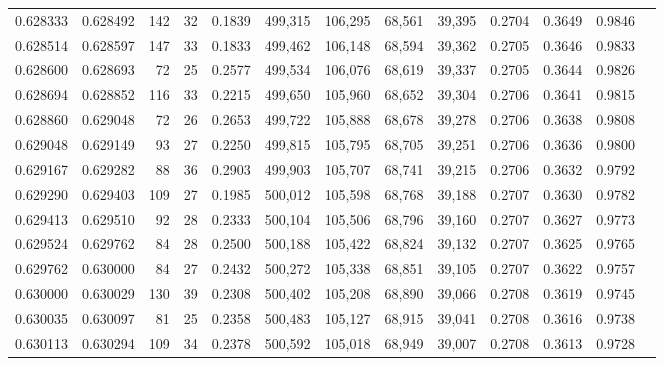 \begin{tabular}{rrrrrrrrrrrrr}
0.628333 & 0.628492 &    142 &    32 &                                     0.1839 & 499,315 & 106,295 &  68,561 &  39,395 & 0.2704 & 0.3649 & 0.9846 \\
0.628514 & 0.628597 &    147 &    33 &                                     0.1833 & 499,462 & 106,148 &  68,594 &  39,362 & 0.2705 & 0.3646 & 0.9833 \\
0.628600 & 0.628693 &     72 &    25 &                                     0.2577 & 499,534 & 106,076 &  68,619 &  39,337 & 0.2705 & 0.3644 & 0.9826 \\
0.628694 & 0.628852 &    116 &    33 &                                     0.2215 & 499,650 & 105,960 &  68,652 &  39,304 & 0.2706 & 0.3641 & 0.9815 \\
0.628860 & 0.629048 &     72 &    26 &                                     0.2653 & 499,722 & 105,888 &  68,678 &  39,278 & 0.2706 & 0.3638 & 0.9808 \\
0.629048 & 0.629149 &     93 &    27 &                                     0.2250 & 499,815 & 105,795 &  68,705 &  39,251 & 0.2706 & 0.3636 & 0.9800 \\
0.629167 & 0.629282 &     88 &    36 &                                     0.2903 & 499,903 & 105,707 &  68,741 &  39,215 & 0.2706 & 0.3632 & 0.9792 \\
0.629290 & 0.629403 &    109 &    27 &                                     0.1985 & 500,012 & 105,598 &  68,768 &  39,188 & 0.2707 & 0.3630 & 0.9782 \\
0.629413 & 0.629510 &     92 &    28 &                                     0.2333 & 500,104 & 105,506 &  68,796 &  39,160 & 0.2707 & 0.3627 & 0.9773 \\
0.629524 & 0.629762 &     84 &    28 &                                     0.2500 & 500,188 & 105,422 &  68,824 &  39,132 & 0.2707 & 0.3625 & 0.9765 \\
0.629762 & 0.630000 &     84 &    27 &                                     0.2432 & 500,272 & 105,338 &  68,851 &  39,105 & 0.2707 & 0.3622 & 0.9757 \\
0.630000 & 0.630029 &    130 &    39 &                                     0.2308 & 500,402 & 105,208 &  68,890 &  39,066 & 0.2708 & 0.3619 & 0.9745 \\
0.630035 & 0.630097 &     81 &    25 &                                     0.2358 & 500,483 & 105,127 &  68,915 &  39,041 & 0.2708 & 0.3616 & 0.9738 \\
0.630113 & 0.630294 &    109 &    34 &                                     0.2378 & 500,592 & 105,018 &  68,949 &  39,007 & 0.2708 & 0.3613 & 0.9728 \\

\end{tabular}
